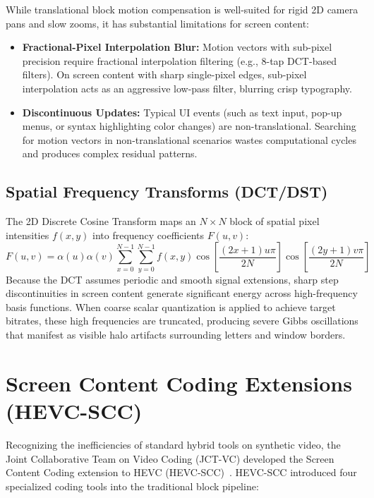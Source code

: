 While translational block motion compensation is well-suited for rigid 2D camera pans and slow zooms, it has substantial limitations for screen content:
\begin{itemize}
    \item \textbf{Fractional-Pixel Interpolation Blur:} Motion vectors with sub-pixel precision require fractional interpolation filtering (e.g., 8-tap DCT-based filters). On screen content with sharp single-pixel edges, sub-pixel interpolation acts as an aggressive low-pass filter, blurring crisp typography.
    \item \textbf{Discontinuous Updates:} Typical UI events (such as text input, pop-up menus, or syntax highlighting color changes) are non-translational. Searching for motion vectors in non-translational scenarios wastes computational cycles and produces complex residual patterns.
\end{itemize}

\subsection{Spatial Frequency Transforms (DCT/DST)}
The 2D Discrete Cosine Transform maps an $N \times N$ block of spatial pixel intensities $f(x, y)$ into frequency coefficients $F(u, v)$:
\begin{equation}
    F(u, v) = \alpha(u)\alpha(v) \sum_{x=0}^{N-1}\sum_{y=0}^{N-1} f(x, y) \cos\left[\frac{(2x+1)u\pi}{2N}\right] \cos\left[\frac{(2y+1)v\pi}{2N}\right]
\end{equation}
Because the DCT assumes periodic and smooth signal extensions, sharp step discontinuities in screen content generate significant energy across high-frequency basis functions. When coarse scalar quantization is applied to achieve target bitrates, these high frequencies are truncated, producing severe Gibbs oscillations that manifest as visible halo artifacts surrounding letters and window borders.

\section{Screen Content Coding Extensions (HEVC-SCC)}
Recognizing the inefficiencies of standard hybrid tools on synthetic video, the Joint Collaborative Team on Video Coding (JCT-VC) developed the Screen Content Coding extension to HEVC (HEVC-SCC)~\cite{xu2015overview,lin2015overview}. HEVC-SCC introduced four specialized coding tools into the traditional block pipeline:

